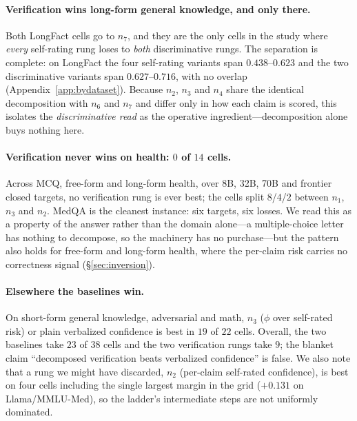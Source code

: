 \documentclass[11pt]{article}
\begin{document}
\paragraph{Verification wins long-form general knowledge, and only there.} Both LongFact cells go
to $n_7$, and they are the only cells in the study where \emph{every} self-rating rung loses to
\emph{both} discriminative rungs. The separation is complete: on LongFact the four self-rating
variants span $0.438$--$0.623$ and the two discriminative variants span $0.627$--$0.716$, with no
overlap (Appendix~\ref{app:bydataset}). Because $n_2$, $n_3$ and $n_4$ share the identical
decomposition with $n_6$ and $n_7$ and differ only in how each claim is scored, this isolates the
\emph{discriminative read} as the operative ingredient---decomposition alone buys nothing here.

\paragraph{Verification never wins on health: $0$ of $14$ cells.} Across MCQ, free-form and
long-form health, over 8B, 32B, 70B and frontier closed targets, no verification rung is ever
best; the cells split $8$/$4$/$2$ between $n_1$, $n_3$ and $n_2$. MedQA is the cleanest instance:
six targets, six losses. We read this as a property of the answer rather than the domain
alone---a multiple-choice letter has nothing to decompose, so the machinery has no purchase---but
the pattern also holds for free-form and long-form health, where the per-claim risk carries no
correctness signal (\S\ref{sec:inversion}).

\paragraph{Elsewhere the baselines win.} On short-form general knowledge, adversarial and math,
$n_3$ ($\phi$ over self-rated risk) or plain verbalized confidence is best in $19$ of $22$ cells.
Overall, the two baselines take $23$ of $38$ cells and the two verification rungs take $9$; the
blanket claim ``decomposed verification beats verbalized confidence'' is false. We also note that a rung we might have discarded, $n_2$ (per-claim
self-rated confidence), is best on four cells including the single largest margin in the grid
($+0.131$ on Llama/MMLU-Med), so the ladder's intermediate steps are not uniformly dominated.
\end{document}
